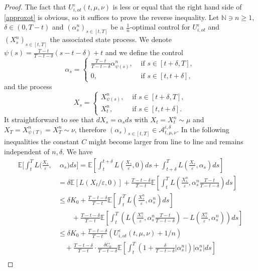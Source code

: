 \documentclass[reqno,11pt]{amsart}
\numberwithin{equation}{section}
\newcommand{\e}{\varepsilon}
\begin{document}
\begin{proof}
    The fact that $U^\e_{i,ot}(t,\mu,\nu)$ is less or equal that the right hand side of \eqref{approxot} is obvious, so it suffices to prove the reverse inequality. Let $\mathbb{N}\ni n\ge 1$, $\delta\in (0,T-t)$ and $(\alpha_s^n)_{s\in [t,T]}$ be a $\frac{1}{n}$-optimal control for $U^\e_{i,ot}$ and $(X^n_s)_{s\in [t,T]}$ the associated state process. We denote $\psi(s)=\frac{T-t}{T-t-\delta}(s-t-\delta)+t$ and we define the control
    $$\alpha_s=\begin{cases}
        \frac{T-t}{T-t-\delta}\alpha_{\psi(s)}^n, &\text{ if }s\in [t+\delta, T],\\
        0, &\text{ if }s\in [t,t+\delta],
    \end{cases}$$
    and the process
    $$X_s=\begin{cases}
        X_{\psi(s)}^n,&\text{ if }s\in [t+\delta,T],\\
        X_t^n,&\text{ if }s\in [t,t+\delta].
    \end{cases}$$
    It straightforward to see that $dX_s=\alpha_sds$ with $X_t=X_t^n\sim \mu$ and $X_T=X^n_{\psi(T)}=X^n_T\sim \nu$, therefore $(\alpha_s)_{s\in [t,T]}\in \mathcal{A}^{i,\delta}_{t,\mu,\nu}$. In the following inequalities the constant $C$ might become larger from line to line and remains independent of $n,\delta$. We have
    \begin{align*}
        \mathbb{E}\bigg[ \int_t^TL\big( \frac{X_s}{\e},&\;\alpha_s\big)ds \bigg]=\mathbb{E}\left[ \int_t^{t+\delta}L\left( \frac{X_s}{\e},0\right)ds + \int_{t+\delta}^TL\left( \frac{X_s}{\e},\alpha_s\right)ds \right]\\
        &=\delta\mathbb{E}[L(X_t/\e,0)]+\frac{T-t-\delta}{T-t}\mathbb{E}\left[ \int_t^TL\left( \frac{X_s^n}{\e},\alpha_s^n\frac{T-t}{T-t-\delta}\right)ds \right]\\
        &\le \delta K_0+\frac{T-t-\delta}{T-t}\mathbb{E}\left[ \int_t^TL\left( \frac{X_s^n}{\e},\alpha_s^n\right)ds \right]\\
        &\qquad+\frac{T-t-\delta}{T-t}\mathbb{E}\left[ \int_t^T\left(L\left( \frac{X_s^n}{\e},\alpha_s^n\frac{T-t}{T-t-\delta}\right)  - L\left( \frac{X_s^n}{\e},\alpha_s^n\right)\right)ds  \right]\\
        &\le \delta K_0+\frac{T-t-\delta}{T-t}(U_{i,ot}^\e(t,\mu,\nu)+1/n)\\
        &\quad +\frac{T-t-\delta}{T-t}\cdot \frac{\delta C_0}{T-t-\delta}\mathbb{E}\left[ \int_t^T\left(1+\frac{\delta}{T-t-\delta}|\alpha_s^n|\right)|\alpha_s^n|ds\right]\\

\end{align*}
\end{proof}
\end{document}
